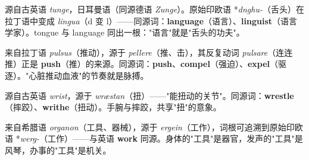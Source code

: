 \documentclass[../main.tex]{subfiles}
\begin{document}
\begin{origin}
源自古英语 \textit{tunge}，日耳曼语（同源德语 \textit{Zunge}）。原始印欧语 *\textit{dnghu-}（舌头）在拉丁语中变成 \textit{lingua}（d 变 l）——同源词：\textbf{language}（语言）、\textbf{linguist}（语言学家）。tongue 与 language 同出一根："语言"就是"舌头的功夫"。
\end{origin}





\begin{origin}
来自拉丁语 \textit{pulsus}（推动），源于 \textit{pellere}（推、击），其反复动词 \textit{pulsare}（连连推）正是 \textbf{push}（推）的来源。同源词：\textbf{push}、\textbf{compel}（强迫）、\textbf{expel}（驱逐）。"心脏推动血液"的节奏就是脉搏。
\end{origin}



\begin{origin}
源自古英语 \textit{wrist}，源于 \textit{wræstan}（扭）——"能扭动的关节"。同源词：\textbf{wrestle}（摔跤）、\textbf{writhe}（扭动）。手腕与摔跤，共享"扭"的意象。
\end{origin}





\begin{origin}
来自希腊语 \textit{organon}（工具、器械），源于 \textit{ergein}（工作），词根可追溯到原始印欧语 *\textit{werg-}（工作）——与英语 \textbf{work} 同源。身体的"工具"是器官，发声的"工具"是风琴，办事的"工具"是机关。
\end{origin}

\end{document}
